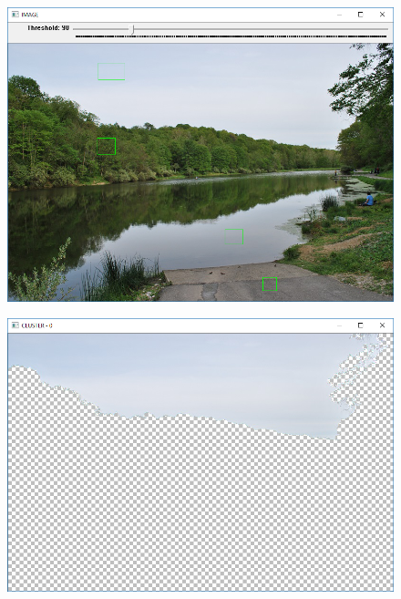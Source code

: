 \documentclass[czech, master, public, dept460, male, cpdeclaration, oneside]{diploma}
\begin{document}
\begin{figure}[H]
	\vspace*{+3.0mm}
	\centering
	\includegraphics[width=13cm]{Figures/results/euclidean/img2/original.png}
\end{figure}
\begin{figure}[H]
	\vspace*{+3.0mm}
	\centering
	\includegraphics[width=13cm]{Figures/results/euclidean/img2/cluster0.png}
\end{figure}
\end{document}
